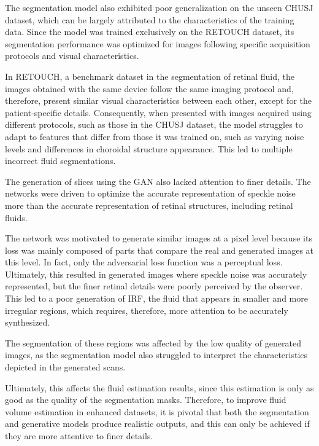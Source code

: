 \par
The segmentation model also exhibited poor generalization on the unseen CHUSJ dataset, which can be largely attributed to the characteristics of the training data. Since the model was trained exclusively on the RETOUCH dataset, its segmentation performance was optimized for images following specific acquisition protocols and visual characteristics.
\par
In RETOUCH, a benchmark dataset in the segmentation of retinal fluid, the images obtained with the same device follow the same imaging protocol and, therefore, present similar visual characteristics between each other, except for the patient-specific  details. Consequently, when presented with images acquired using different protocols, such as those in the CHUSJ dataset, the model struggles to adapt to features that differ from those it was trained on, such as varying noise levels and differences in choroidal structure appearance. This led to multiple incorrect fluid segmentations.
\par
The generation of slices using the GAN also lacked attention to finer details. The networks were driven to optimize the accurate representation of speckle noise more than the accurate representation of retinal structures, including retinal fluids.
\par
The network was motivated to generate similar images at a pixel level because its loss was mainly composed of parts that compare the real and generated images at this level. In fact, only the adversarial loss function was a perceptual loss. Ultimately, this resulted in generated images where speckle noise was accurately represented, but the finer retinal details were poorly perceived by the observer. This led to a poor generation of IRF, the fluid that appears in smaller and more irregular regions, which requires, therefore, more attention to be accurately synthesized. 
\par
The segmentation of these regions was affected by the low quality of generated images, as the segmentation model also struggled to interpret the characteristics depicted in the generated scans.
\par
Ultimately, this affects the fluid estimation results, since this estimation is only as good as the quality of the segmentation masks. Therefore, to improve fluid volume estimation in enhanced datasets, it is pivotal that both the segmentation and generative models produce realistic outputs, and this can only be achieved if they are more attentive to finer details.

